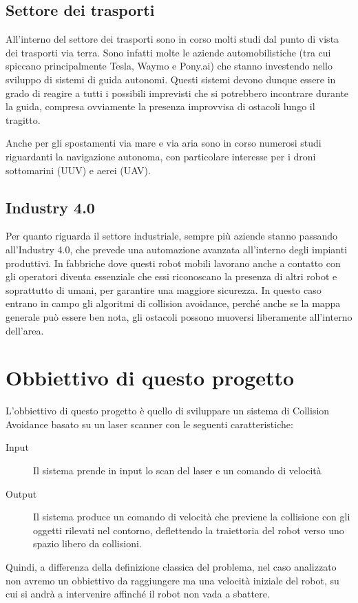 \documentclass[Lau, binding=0.6cm, oneside]{sapthesis}
\begin{document}
\subsection{Settore dei trasporti}
All'interno del settore dei trasporti sono in corso molti studi dal punto di vista dei trasporti via terra.
Sono infatti molte le aziende automobilistiche (tra cui spiccano principalmente Tesla, Waymo e Pony.ai) che stanno investendo nello sviluppo di sistemi di guida autonomi.
Questi sistemi devono dunque essere in grado di reagire a tutti i possibili imprevisti che si potrebbero incontrare durante la guida, compresa ovviamente la presenza improvvisa di ostacoli lungo il tragitto.

Anche per gli spostamenti via mare e via aria sono in corso numerosi studi riguardanti la navigazione autonoma, con particolare interesse per i droni sottomarini (UUV) e aerei (UAV).

\subsection{Industry 4.0}
Per quanto riguarda il settore industriale, sempre più aziende stanno passando all'Industry 4.0, che prevede una automazione avanzata all'interno degli impianti produttivi.
In fabbriche dove questi robot mobili lavorano anche a contatto con gli operatori diventa essenziale che essi riconoscano la presenza di altri robot e soprattutto di umani, per garantire una maggiore sicurezza.
In questo caso entrano in campo gli algoritmi di collision avoidance, perché anche se la mappa generale può essere ben nota, gli ostacoli possono muoversi liberamente all'interno dell'area.

\section{Obbiettivo di questo progetto}
L'obbiettivo di questo progetto è quello di sviluppare un sistema di Collision Avoidance basato su un laser scanner con le seguenti caratteristiche:
\begin{description}
	\item[Input] Il sistema prende in input lo scan del laser e un comando di velocità
	\item[Output] Il sistema produce un comando di velocità che previene la collisione con gli oggetti rilevati nel contorno, deflettendo la traiettoria del robot verso uno spazio libero da collisioni.
\end{description}
Quindi, a differenza della definizione classica del problema, nel caso analizzato non avremo un obbiettivo da raggiungere ma una velocità iniziale del robot, su cui si andrà a intervenire affinché il robot non vada a sbattere.
\end{document}
